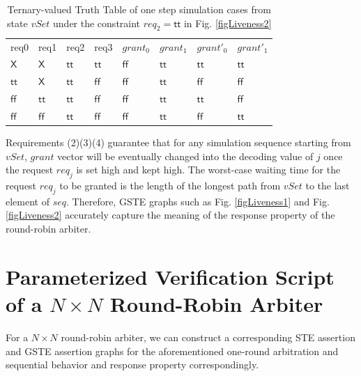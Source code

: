 \documentclass[final]{IEEEtran}
\newcommand{\mathid}[1]{\ensuremath{\mathit{#1}}}
\begin{document}
\begin{center}
\begin{table}[tbp]
\caption{Ternary-valued Truth Table of one step simulation cases
from state $vSet$ under the constraint $req_2=\mathsf{tt}$ in Fig.
\ref{figLiveness2}} \label{tab2}
\begin{center}
\begin{tabular}{llllllll}
req0 & req1 & req2 & req3 & $grant_0$ & $grant_1$ & $grant'_0$ & $grant'_1$ \\


$\mathsf{X}$ & $\mathsf{X}$ & $\mathsf{tt}$ & $\mathsf{tt}$ &
$\mathsf{ff}$ & $\mathsf{tt}$ &
 $\mathsf{tt}$ & $\mathsf{tt}$ \\

$\mathsf{tt}$ & $\mathsf{X}$ & $\mathsf{tt}$ & $\mathsf{ff}$ &
$\mathsf{ff}$ & $\mathsf{tt}$ & $\mathsf{ff}$ & $\mathsf{ff}$\\

$\mathsf{ff}$ & $\mathsf{tt}$ & $\mathsf{tt}$ & $\mathsf{ff}$ &
$\mathsf{ff}$ & $\mathsf{tt}$ & $\mathsf{tt}$ & $\mathsf{ff}$\\

$\mathsf{ff}$ & $\mathsf{ff}$ & $\mathsf{tt}$ & $\mathsf{ff}$ &
$\mathsf{ff}$ & $\mathsf{tt}$ & $\mathsf{ff}$ & $\mathsf{tt}$
\end{tabular}%
\end{center}
\end{table}
\end{center}

Requirements (2)(3)(4) guarantee that for any simulation sequence
starting from $vSet$,
 $\mathid{grant}$ vector will be eventually changed into the decoding value of $j$ once the request
$req_j$ is set high and kept high. The  worst-case waiting time for
 the request $req_j$ to be granted  is the length of the longest path from
$vSet$ to the last element of $seq$. Therefore, GSTE graphs such as
Fig. \ref{figLiveness1} and Fig. \ref{figLiveness2} accurately capture
the meaning of the response property of the round-robin arbiter.



\section{Parameterized Verification Script of a $N \times N $ Round-Robin Arbiter}
\label{sec:Verification} For a $N \times N$  round-robin arbiter, we
can construct a corresponding STE assertion and GSTE assertion
graphs for the aforementioned one-round arbitration and sequential
behavior and response property correspondingly.
\end{document}
